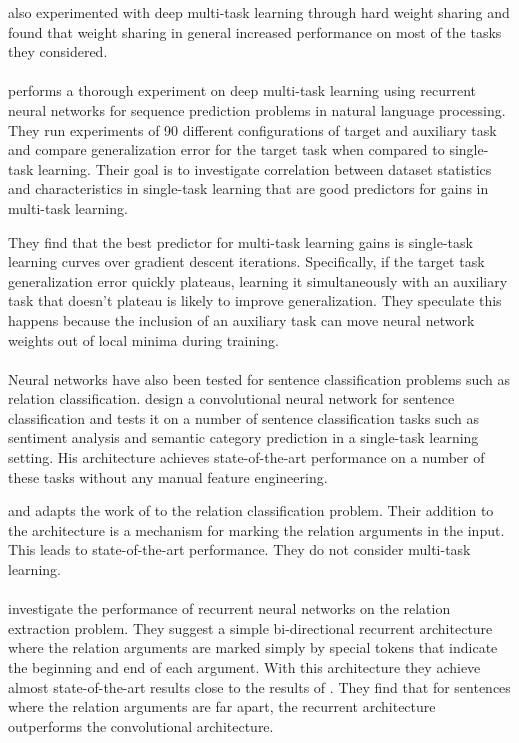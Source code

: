 \citet{collobert2011} also experimented with deep multi-task learning through hard weight sharing and found that weight sharing in general increased performance on most of the tasks they considered.
\\\\
\citet{bingel2017} performs a thorough experiment on deep multi-task learning using recurrent neural networks for sequence prediction problems in natural language processing. They run experiments of 90 different configurations of target and auxiliary task and compare generalization error for the target task when compared to single-task learning. Their goal is to investigate correlation between dataset statistics and characteristics in single-task learning that are good predictors for gains in multi-task learning.

They find that the best predictor for multi-task learning gains is single-task learning curves over gradient descent iterations. Specifically, if the target task generalization error quickly plateaus, learning it simultaneously with an auxiliary task that doesn't plateau is likely to improve generalization. They speculate this happens because the inclusion of an auxiliary task can move neural network weights out of local minima during training.
\\\\
Neural networks have also been tested for sentence classification problems such as relation classification. \citet{kim2014} design a convolutional neural network for sentence classification and tests it on a number of sentence classification tasks such as sentiment analysis and semantic category prediction in a single-task learning setting. His architecture achieves state-of-the-art performance on a number of these tasks without any manual feature engineering.

\citet{nguyen2015} and adapts the work of \citet{kim2014} to the relation classification problem. Their addition to the architecture is a mechanism for marking the relation arguments in the input. This leads to state-of-the-art performance. They do not consider multi-task learning.
\\\\
\citet{zhang2015} investigate the performance of recurrent neural networks on the relation extraction problem. They suggest a simple bi-directional recurrent architecture where the relation arguments are marked simply by special tokens that indicate the beginning and end of each argument. With this architecture they achieve almost state-of-the-art results close to the results of \citet{nguyen2015}. They find that for sentences where the relation arguments are far apart, the recurrent architecture outperforms the convolutional architecture.